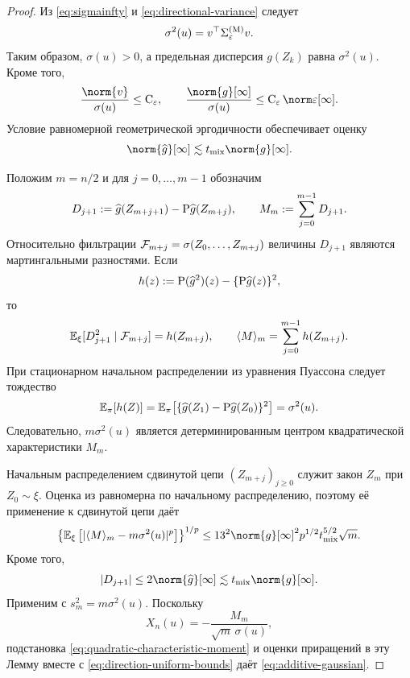 \begin{proof}
Из \eqref{eq:sigmainfty} и \eqref{eq:directional-variance} следует
\begin{equation}\label{eq:projected-variance}
 \sigma^2(u)=v^\top\Sigma^{(\mathrm{M})}_\varepsilon v.
\end{equation}
Таким образом, $\sigma(u)>0$, а предельная дисперсия $g(Z_k)$ равна
$\sigma^2(u)$. Кроме того,
\begin{equation}\label{eq:direction-uniform-bounds}
 \frac{\norm{v}}{\sigma(u)}\leq\Const{\varepsilon},
 \qquad
 \frac{\norm{g}[\infty]}{\sigma(u)}
 \leq \Const{\varepsilon}\supconsteps.
\end{equation}
Условие равномерной геометрической эргодичности обеспечивает оценку
\[
 \norm{\widehat g}[\infty]
 \lesssim\taumix\norm{g}[\infty].
\]

Положим $m=n/2$ и для $j=0,\ldots,m-1$ обозначим
\[
 D_{j+1}:=\widehat g(Z_{m+j+1})-\mathrm{P}\widehat g(Z_{m+j}),
 \qquad
 M_m:=\sum_{j=0}^{m-1}D_{j+1}.
\]
Относительно фильтрации
$\mathcal{F}_{m+j}=\sigma(Z_0,\ldots,Z_{m+j})$ величины $D_{j+1}$ являются
мартингальными разностями. Если
\[
 h(z):=\mathrm{P}(\widehat g^2)(z)
       -\{\mathrm{P}\widehat g(z)\}^2,
\]
то
\[
 \mathbb{E}_\xi[D_{j+1}^2\mid\mathcal{F}_{m+j}]=h(Z_{m+j}),
 \qquad
 \langle M\rangle_m=\sum_{j=0}^{m-1}h(Z_{m+j}).
\]
При стационарном начальном распределении из уравнения Пуассона следует
тождество
\[
 \mathbb{E}_\pi[h(Z)]
 =\mathbb{E}_\pi\!\left[
   \{\widehat g(Z_1)-\mathrm{P}\widehat g(Z_0)\}^2
  \right]
 =\sigma^2(u).
\]
Следовательно, $m\sigma^2(u)$ является детерминированным центром
квадратической характеристики $M_m$.

Начальным распределением сдвинутой цепи $(Z_{m+j})_{j\geq0}$ служит закон
$Z_m$ при $Z_0\sim\xi$. Оценка из \cite[Лемма~22]{Samsonov2025} равномерна
по начальному распределению, поэтому её применение к сдвинутой
цепи даёт
\begin{equation}\label{eq:quadratic-characteristic-moment}
 \left\{\PE_\xi\left[
  \abs{\langle M\rangle_m-m\sigma^2(u)}^p
 \right]\right\}^{1/p}
 \leq 13^2\norm{g}[\infty]^2p^{1/2}\taumix^{5/2}\sqrt m.
\end{equation}
Кроме того,
\[
 \abs{D_{j+1}}\leq2\norm{\widehat g}[\infty]
 \lesssim\taumix\norm{g}[\infty].
\]
Применим \cite[Лемма~21]{Samsonov2025} с
$s_m^2=m\sigma^2(u)$. Поскольку
\[
 X_n(u)=-\frac{M_m}{\sqrt m\,\sigma(u)},
\]
подстановка \eqref{eq:quadratic-characteristic-moment} и оценки приращений в
эту Лемму вместе с \eqref{eq:direction-uniform-bounds} даёт
\eqref{eq:additive-gaussian}.
\end{proof}

